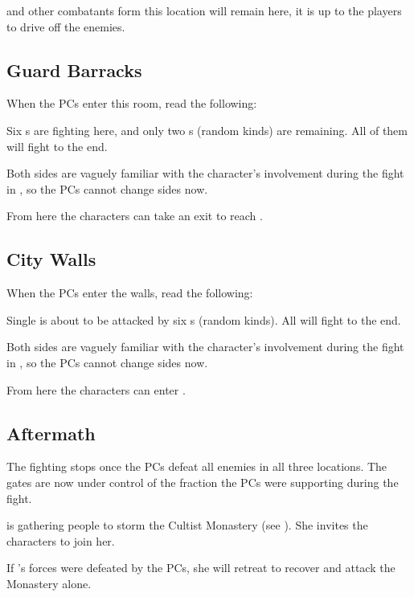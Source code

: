 \npcHighmarshal{} and other combatants form this location will remain here, it is up to the players to drive off the enemies.




\subsection{Guard Barracks}
\label{ssec:gatesBarracks}

When the PCs enter this room, read the following:


Six \enemyWallGuard{}s are fighting here, and only two \enemyCultist{}s (random kinds) are remaining. All of them will fight to the end.

Both sides are vaguely familiar with the character's involvement during the fight in , so the PCs cannot change sides now.

From here the characters can take an exit to reach .




\subsection{City Walls}
\label{ssec:gatesWalls}

When the PCs enter the walls, read the following:


Single \enemyWallGuard{} is about to be attacked by six \enemyCultist{}s (random kinds). All will fight to the end.

Both sides are vaguely familiar with the character's involvement during the fight in , so the PCs cannot change sides now.

From here the characters can enter .




\subsection{Aftermath}

The fighting stops once the PCs defeat all enemies in all three locations. The gates are now under control of the fraction the PCs were supporting during the fight.

\npcHighmarshal{} is gathering people to storm the Cultist Monastery (see ). She invites the characters to join her.

If \npcHighmarshal{}'s forces were defeated by the PCs, she will retreat to recover and attack the Monastery alone.